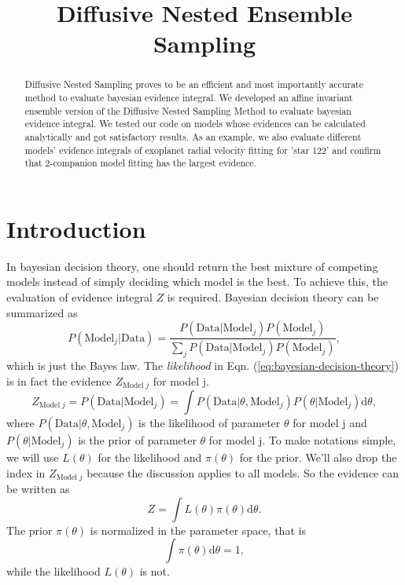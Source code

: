 \documentclass[letterpaper, preprint]{aastex}
\begin{document}
\title{
  Diffusive Nested Ensemble Sampling
}

\begin{abstract}
Diffusive Nested Sampling proves to be an efficient and most importantly accurate method to evaluate bayesian evidence integral. We developed an affine invariant ensemble version of the Diffusive Nested Sampling Method to evaluate bayesian evidence integral. We tested our code on models whose evidences can be calculated analytically and got satisfactory results. As an example, we also evaluate different models' evidence integrals of exoplanet radial velocity fitting for 'star 122' and confirm that 2-companion model fitting has the largest evidence.

\end{abstract}


\section{Introduction}

In bayesian decision theory, one should return the best mixture of competing models instead of simply deciding which model is the best. To achieve this, the evaluation of evidence integral $Z$ is required. Bayesian decision theory can be summarized as
\begin{equation}
P(\mathrm{Model}_j|\mathrm{Data})=\frac{P(\mathrm{Data}|\mathrm{Model}_j)P(\mathrm{Model}_j)}{\sum_j{P(\mathrm{Data}|\mathrm{Model}_j)P(\mathrm{Model}_j)}},
\label{eq:bayesian-decision-theory}
\end{equation}
which is just the Bayes law. The \textit{likelihood} in Eqn. (\ref{eq:bayesian-decision-theory}) is in fact the evidence $Z_{\mathrm{Model}\;j}$ for model j.
\begin{equation}
Z_{\mathrm{Model}\;j}=P(\mathrm{Data}|\mathrm{Model}_j)=\int P(\mathrm{Data}|\theta, \mathrm{Model}_j) P(\theta|\mathrm{Model}_j)\mathrm{d}\theta,
\end{equation}
where $P(\mathrm{Data}|\theta, \mathrm{Model}_j)$ is the likelihood of parameter $\theta$ for model j and $P(\theta|\mathrm{Model}_j)$ is the prior of parameter $\theta$ for model j. To make notations simple, we will use $L(\theta)$ for the likelihood and $\pi(\theta)$ for the prior. We'll also drop the index in $Z_{\mathrm{Model}\;j}$ because the discussion applies to all models. So the evidence can be written as
\begin{equation}
Z=\int\! L(\theta)\pi(\theta)\mathrm{d}\theta.
\end{equation}
The prior $\pi(\theta)$ is normalized in the parameter space, that is
\begin{equation}
\int\!\pi(\theta)\mathrm{d}\theta=1,
\end{equation}
while the likelihood $L(\theta)$ is not.
\end{document}
